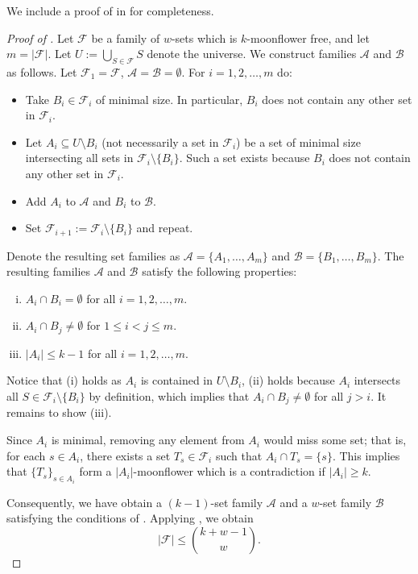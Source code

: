 \documentclass{article}
\newcommand{\<}{\langle}
\renewcommand{\>}{\rangle}
\newcommand{\calA}{\mathcal{A}}
\newcommand{\calB}{\mathcal{B}}
\newcommand{\calF}{\mathcal{F}}
\begin{document}
 We include a proof of  in  for completeness.

\begin{proof}[Proof of ] Let $\calF $ be a family of $w$-sets which is $k$-moonflower free, and let $m=|\calF|$. Let $U:= \bigcup_{S \in \calF} S$ denote the universe. We construct families $\calA$ and $\calB$ as follows. Let $\calF_1 = \calF$,  $\calA=\calB = \emptyset$. For $i = 1,2,\ldots,m$ do:
\begin{itemize}
    \item Take $B_i \in \calF_i$ of minimal size. In particular, $B_i$ does not contain any other set in $\calF_i$. 
    \item Let $A_i \subseteq U \setminus B_i$ (not necessarily a set in $\calF_i$) be a set of minimal size intersecting all sets in $\calF_i \setminus \{B_i\}$. Such a set exists because $B_i$ does not contain any other set in $\calF_i$.
    \item Add $A_i$ to $\calA$ and $B_i$ to $\calB$.
    \item Set $\calF_{i+1} := \calF_i \setminus \{B_i\}$ and repeat.
\end{itemize}
Denote the resulting set families as $\calA = \{A_1,\ldots,A_m\}$ and $\calB = \{B_1,\ldots,B_m\}$. The resulting families $\calA$ and $\calB$ satisfy the following properties:
\begin{enumerate}[(i)]
    \item $A_i \cap B_i = \emptyset$ for all $i = 1,2,\ldots,m$.
    \item $A_i \cap B_j \neq \emptyset$ for $1 \leq i < j \leq m$.
    \item $|A_i| \leq k-1$ for all $i = 1,2,\ldots,m$.
\end{enumerate}
Notice that (i) holds as $A_i$ is contained in $U \setminus B_i$, (ii) holds because $A_i$ intersects all $S \in \calF_i \setminus \{B_i\}$ by definition, which implies that $A_i \cap B_j \neq \emptyset$ for all $j > i$. It remains to show (iii).

Since $A_i$ is minimal, removing any element from $A_i$ would miss some set; 
that is, for each $s \in A_i$, there exists a set $T_s \in \calF_i$ such that $A_i \cap T_s = \{s\}$. This implies that $\{T_s\}_{s \in A_i}$ form a $|A_i|$-moonflower which is a contradiction if $|A_i| \geq k$. 

Consequently, we have obtain a $(k-1)$-set family $\calA$ and a $w$-set family $\calB$ satisfying the conditions of .  Applying , we obtain 
\[
|\calF| \leq \binom{k+w-1}{w}.
\]
\end{proof}
\end{document}
